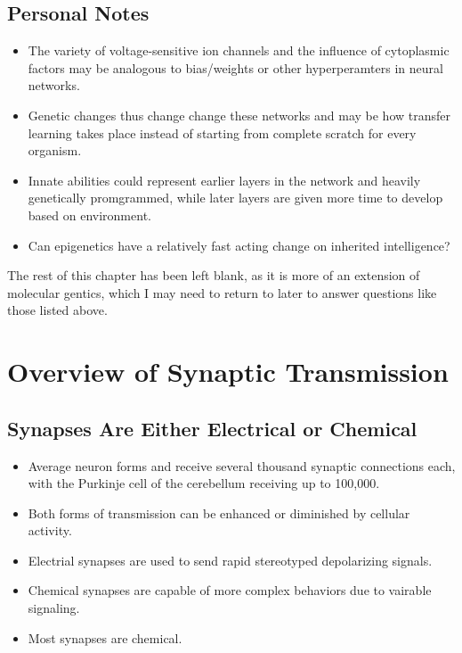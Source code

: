 \documentclass[12pt,a4paper]{article}
\begin{document}
\subsection{Personal Notes}
\begin{itemize}
    \item The variety of voltage-sensitive ion channels and the influence of cytoplasmic factors may be analogous to bias/weights or other hyperperamters in neural networks.
    \item Genetic changes thus change change these networks and may be how transfer learning takes place instead of starting from complete scratch for every organism. 
    \item Innate abilities could represent earlier layers in the network and heavily genetically promgrammed, while later layers are given more time to develop based on environment. 
    \item Can epigenetics have a relatively fast acting change on inherited intelligence? 
\end{itemize}

\begin{center}
    The rest of this chapter has been left blank, as it is more of an extension of molecular gentics, which I may need to return to later to answer questions like those listed above.
\end{center}

\clearpage
{}
\clearpage
\section{Overview of Synaptic Transmission}
\subsection{Synapses Are Either Electrical or Chemical}
\begin{itemize}
    \item Average neuron forms and receive several thousand synaptic connections each, with the Purkinje cell of the cerebellum receiving up to 100,000.
    \item Both forms of transmission can be enhanced or diminished by cellular activity.
    \item Electrial synapses are used to send rapid stereotyped depolarizing signals.
    \item Chemical synapses are capable of more complex behaviors due to vairable signaling. 
    \item Most synapses are chemical.
\end{itemize}
\end{document}
